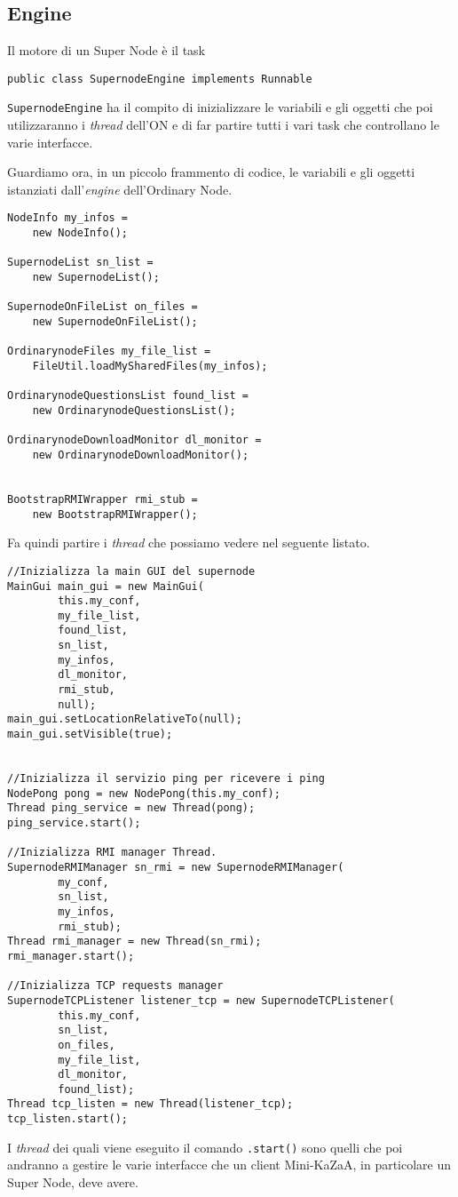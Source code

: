 \subsection{Engine}
Il motore di un Super Node è il task 
\begin{verbatim}
public class SupernodeEngine implements Runnable
\end{verbatim}
\verb|SupernodeEngine| ha il compito di inizializzare le variabili e gli oggetti che poi utilizzaranno i \emph{thread} dell'ON e di far partire tutti i vari task che controllano le varie interfacce.

Guardiamo ora, in un piccolo frammento di codice, le variabili e gli oggetti istanziati dall'\emph{engine} dell'Ordinary Node.
\begin{lstlisting}
NodeInfo my_infos = 
	new NodeInfo();

SupernodeList sn_list = 
	new SupernodeList();

SupernodeOnFileList on_files = 
	new SupernodeOnFileList();

OrdinarynodeFiles my_file_list = 
	FileUtil.loadMySharedFiles(my_infos);

OrdinarynodeQuestionsList found_list = 
	new OrdinarynodeQuestionsList();

OrdinarynodeDownloadMonitor dl_monitor = 
	new OrdinarynodeDownloadMonitor();


BootstrapRMIWrapper rmi_stub = 
	new BootstrapRMIWrapper();
\end{lstlisting}
Fa quindi partire i \emph{thread} che possiamo vedere nel seguente listato.
\begin{lstlisting}
//Inizializza la main GUI del supernode
MainGui main_gui = new MainGui(
		this.my_conf,
		my_file_list,
		found_list,
		sn_list,
		my_infos,
		dl_monitor,
		rmi_stub,
		null);
main_gui.setLocationRelativeTo(null);
main_gui.setVisible(true);

	
//Inizializza il servizio ping per ricevere i ping
NodePong pong = new NodePong(this.my_conf);
Thread ping_service = new Thread(pong);
ping_service.start();

//Inizializza RMI manager Thread.
SupernodeRMIManager sn_rmi = new SupernodeRMIManager(
		my_conf,
		sn_list,
		my_infos,
		rmi_stub);
Thread rmi_manager = new Thread(sn_rmi);
rmi_manager.start();

//Inizializza TCP requests manager
SupernodeTCPListener listener_tcp = new SupernodeTCPListener(
		this.my_conf,
		sn_list,
		on_files,
		my_file_list,
		dl_monitor,
		found_list);
Thread tcp_listen = new Thread(listener_tcp);
tcp_listen.start();
\end{lstlisting}
I \emph{thread} dei quali viene eseguito il comando \verb|.start()| sono quelli che poi andranno a gestire le varie interfacce che un client Mini-KaZaA, in particolare un Super Node, deve avere.

